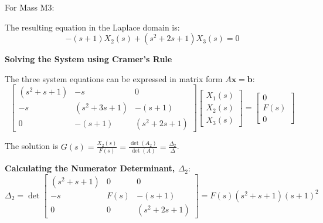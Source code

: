 \documentclass[11pt]{article}
\begin{document}
\newpage
{For Mass M3:}
\begin{figure}[h!]
\centering
{}
\end{figure}

The resulting equation in the Laplace domain is:
\begin{equation}
-(s+1)X_2(s) + (s^2+2s+1)X_3(s) = 0
\end{equation}

\noindent\textbf{Solving the System using Cramer's Rule}
\vspace{12pt}

The three system equations can be expressed in matrix form $A\mathbf{x} = \mathbf{b}$:
$$
\begin{bmatrix}
(s^2+s+1) & -s & 0 \\
-s & (s^2+3s+1) & -(s+1) \\
0 & -(s+1) & (s^2+2s+1)
\end{bmatrix}
\begin{bmatrix}
X_1(s) \\
X_2(s) \\
X_3(s)
\end{bmatrix}
=
\begin{bmatrix}
0 \\
F(s) \\
0
\end{bmatrix}
$$

The solution is $G(s) = \frac{X_2(s)}{F(s)} = \frac{\det(A_2)}{\det(A)} = \frac{\Delta_2}{\Delta}$.

\vspace{12pt}
\noindent\textbf{Calculating the Numerator Determinant, $\Delta_2$}:
$$ \Delta_2 = \det
\begin{bmatrix}
(s^2+s+1) & 0 & 0 \\
-s & F(s) & -(s+1) \\
0 & 0 & (s^2+2s+1)
\end{bmatrix}
= F(s)(s^2+s+1)(s+1)^2$$
\end{document}
